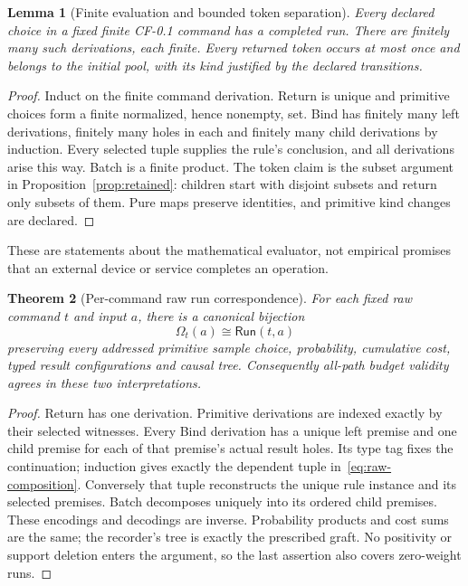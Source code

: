 \documentclass[11pt,a4paper]{article}
\newtheorem{theorem}{Theorem}[section]
\newtheorem{lemma}[theorem]{Lemma}
\theoremstyle{definition}
\newcommand{\Run}{\mathsf{Run}}
\begin{document}
\begin{lemma}[Finite evaluation and bounded token separation]\label{lem:machine}
Every declared choice in a fixed finite CF-0.1 command has a completed run.
There are finitely many such derivations, each finite. Every returned token
occurs at most once and belongs to the initial pool, with its kind justified
by the declared transitions.
\end{lemma}
\begin{proof}
Induct on the finite command derivation. Return is unique and primitive
choices form a finite normalized, hence nonempty, set. Bind has finitely
many left derivations, finitely many holes in each and finitely many child
derivations by induction. Every selected tuple supplies the rule's
conclusion, and all derivations arise this way. Batch is a finite product.
The token claim is the subset argument in Proposition~\ref{prop:retained}:
children start with disjoint subsets and return only subsets of them.
Pure maps preserve identities, and primitive kind changes are declared.
\end{proof}
These are statements about the mathematical evaluator, not empirical
promises that an external device or service completes an operation.

\begin{theorem}[Per-command raw run correspondence]\label{thm:runs}
For each fixed raw command $t$ and input $a$, there is a canonical bijection
\[
 \Omega_t(a)\cong\Run(t,a)
\]
preserving every addressed primitive sample choice, probability, cumulative
cost, typed result configurations and causal tree. Consequently all-path
budget validity agrees in these two interpretations.
\end{theorem}
\begin{proof}
Return has one derivation. Primitive derivations are indexed exactly by
their selected witnesses. Every Bind derivation has a unique left premise
and one child premise for each of that premise's actual result holes. Its type tag fixes the continuation; induction gives exactly the
dependent tuple in~\eqref{eq:raw-composition}. Conversely that tuple
reconstructs the unique rule instance and its selected premises. Batch
decomposes uniquely into its ordered child premises.
These encodings and decodings are inverse. Probability products and cost
sums are the same; the recorder's tree is exactly the prescribed graft.
No positivity or support deletion enters the argument, so the last assertion
also covers zero-weight runs.
\end{proof}
\end{document}
